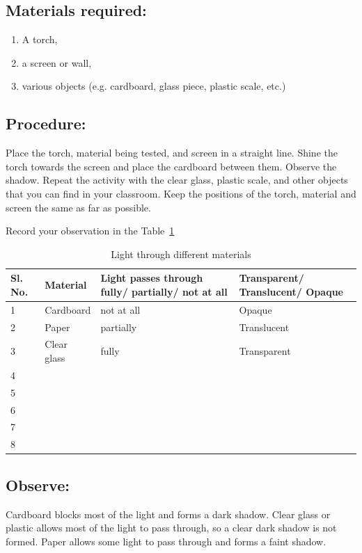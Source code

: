 \documentclass{xtufte-handout}
\begin{document}
\subsection{Materials required:} 
\begin{enumerate}
  \item A torch, 
  \item a screen or wall, 
  \item various objects (e.g. cardboard, glass piece, plastic scale, etc.)
\end{enumerate}
\subsection{Procedure:}
Place the torch, material being tested, and screen in a straight line. Shine the torch towards the screen and place the cardboard between them. Observe the shadow. Repeat the activity with the clear glass, plastic scale, and other objects that you can find in your classroom. Keep the positions of the torch, material and screen the same as far as possible.

Record your observation in the Table~\ref{tab:transparency}
\begin{table}[h!]
  \centering
  \selectfont
  \begin{tabular}{p{}p{}p{}p{}} 
    \toprule
    Sl. No. & Material & Light passes through fully/ partially/ not at all & Transparent/ Translucent/ Opaque\\
    \midrule  
    1& Cardboard& not at all & Opaque \\
    \bottomrule
    2& Paper& partially& Translucent\\
    \bottomrule
    3& Clear glass& fully& Transparent\\
    \bottomrule
    4& & & \\
    \bottomrule
    5& & & \\
    \bottomrule
    6& & & \\
    \bottomrule
    7& & & \\
    \bottomrule
    8& & & \\
    \bottomrule
  \end{tabular}
  \caption{\label{tab:transparency}Light through diﬀerent materials}
\end{table}

\subsection{Observe:} Cardboard blocks most of the light and forms a dark shadow. Clear glass or plastic allows most of the light to pass through, so a clear dark shadow is not formed. Paper allows some light to pass through and forms a faint shadow.
\end{document}
